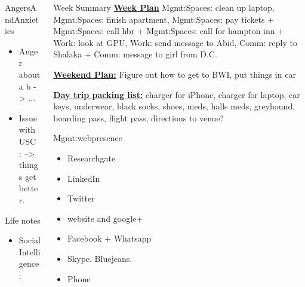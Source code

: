 \documentclass[serif, mathserif, final]{beamer}
\begin{document}
\begin{frame}
\begin{columns}
\begin{column}{0.25\linewidth}
\begin{block}{AngersAndAnxieties}
\begin{itemize}
        \item \tiny Anger about a b  -> ...
        \item \tiny Issue with USC : --> things get better. 
        \end{itemize}
      \end{block}
      \begin{block}{Life notes}
        \begin{itemize}
          \tiny \item \tiny Social Intelligence: 
        \end{itemize}
      \end{block}
    \end{column}



\begin{column}{0.5\linewidth}
 
  \begin{block}{Week Summary}
    {\tiny \underline{\bf Week Plan}
      Mgmt:Spaces: clean up laptop, Mgmt:Spaces: finish apartment,
      Mgmt:Spaces: pay tickets + Mgmt:Spaces: call hbr + Mgmt:Spaces:
      call for hampton inn + Work: look at GPU, Work: send message to Abid, Comm: reply to
      Shalaka + Comm: message to girl from D.C. } 

    {\tiny \underline{\bf Weekend Plan:}} Figure out how to get to
    BWI, put things in car 

    {\underline{\bf Day trip packing list:} charger for iPhone,
      charger for laptop, car keys, underwear, black socks, shoes, meds, halls
      meds, greyhound, boarding pass, flight pass, directions to
      venue?}

    \begin{block}{Mgmt:webpresence}
      \begin{itemize} 
          \tiny \item \tiny Researchgate 
        \item \tiny LinkedIn 
        \item \tiny Twitter 
        \item \tiny website and google+ 
        \item \tiny Facebook + Whatsapp
        \item \tiny Skype.  Bluejeans. 
        \item \tiny Phone
        \end{itemize}
    \end{block}


\end{block}
\end{column}
\end{columns}
\end{frame}
\end{document}
